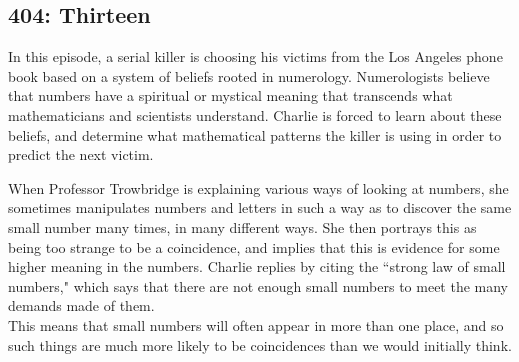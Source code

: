 \newpage
\subsection{404: Thirteen}\label{404}

In this episode, a serial killer is choosing his victims from the Los Angeles phone book based on a system of beliefs rooted in numerology. Numerologists believe that numbers have a spiritual or mystical meaning that transcends what mathematicians and scientists understand. Charlie is forced to learn about these beliefs, and determine what mathematical patterns the killer is using in order to predict the next victim. \\


When Professor Trowbridge is explaining various ways of looking at numbers, she sometimes manipulates numbers and letters in such a way as to discover the same small number many times, in many different ways. She then portrays this as being too strange to be a coincidence, and implies that this is evidence for some higher meaning in the numbers. Charlie replies by citing the ``strong law of small numbers," which says that there are not enough small numbers to meet the many demands made of them. \\

This means that small numbers will often appear in more than one place, and so such things are much more likely to be coincidences than we would initially think. \\

